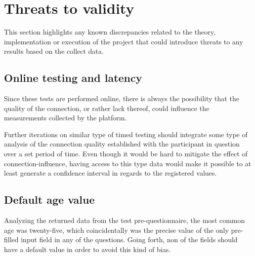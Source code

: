 
  \section{Threats to validity}

  This section highlights any known discrepancies related to the theory,
  implementation or execution of the project that could introduce threats to
  any results based on the collect data.

  \subsection{Online testing and latency}

  Since these tests are performed online, there is always the possibility that
  the quality of the connection, or rather lack thereof, could influence the
  measurements collected by the platform.

  Further iterations on similar type of timed testing should integrate some
  type of analysis of the connection quality established with the participant
  in question over a set period of time. Even though it would be hard to
  mitigate the effect of connection-influence, having access to this type data
  would make it possible to at least generate a confidence interval in regards
  to the registered values.

%
%
%

  \subsection{Default age value}\label{label_validity_default_age}

  Analyzing the returned data from the test pre-questionnaire, the most common
  age was twenty-five, which coincidentally was the precise value of the only
  pre-filled input field in any of the questions. Going forth, non of the
  fields should have a default value in order to avoid this kind of bias.

